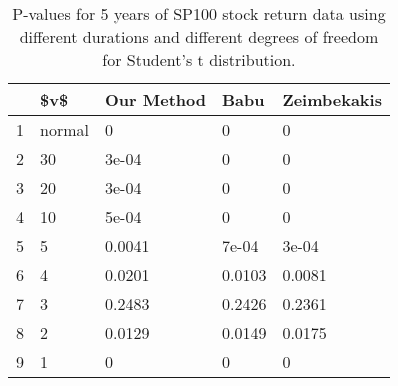 \begin{table}[ht]
\centering
\caption{P-values for 5 years of SP100 stock return 
                   data using different durations
  and different degrees of freedom for Student's t distribution.} 
\label{table:SP1005}
\begin{tabular}{rllll}
  \hline
 & \$v\$ & Our Method & Babu & Zeimbekakis \\ 
  \hline
1 & normal & 0 & 0 & 0 \\ 
  2 & 30 & 3e-04 & 0 & 0 \\ 
  3 & 20 & 3e-04 & 0 & 0 \\ 
  4 & 10 & 5e-04 & 0 & 0 \\ 
  5 & 5 & 0.0041 & 7e-04 & 3e-04 \\ 
  6 & 4 & 0.0201 & 0.0103 & 0.0081 \\ 
  7 & 3 & 0.2483 & 0.2426 & 0.2361 \\ 
  8 & 2 & 0.0129 & 0.0149 & 0.0175 \\ 
  9 & 1 & 0 & 0 & 0 \\ 
   \hline
\end{tabular}
\end{table}

